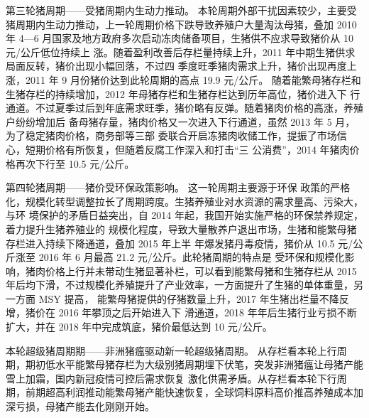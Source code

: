 \documentclass[a4paper,AutoFakeBold,AutoFakeSlant]{ctexart}
\begin{document}
第三轮猪周期——受猪周期内生动力推动。
本轮周期外部干扰因素较少，主要受猪周期内生动力推动，上一轮周期价格下跌导致养殖户大量淘汰母猪，叠加 2010
年 4—6 月国家及地方政府多次启动冻肉储备项目，生猪供不应求导致猪价从 10 元/公斤低位持续上
涨。随着盈利改善后存栏量持续上升，2011 年中期生猪供求局面反转，猪价出现小幅回落，不过四
季度旺季猪肉需求上升，猪价出现再度上涨，2011 年 9 月份猪价达到此轮周期的高点 19.9 元/公斤。
随着能繁母猪存栏和生猪存栏的持续增加，2012 年母猪存栏和生猪存栏达到历年高位，猪价进入下
行通道。不过夏季过后到年底需求旺季，猪价略有反弹。随着猪肉价格的高涨，养殖户纷纷增加后
备母猪存量，猪肉价格又一次进入下行通道，虽然 2013 年 5 月，为了稳定猪肉价格，商务部等三部
委联合开启冻猪肉收储工作，提振了市场信心，短期价格有所恢复，但随着反腐工作深入和打击“三
公消费”，2014 年猪肉价格再次下行至 10.5 元/公斤。

第四轮猪周期——猪价受环保政策影响。
这一轮周期主要源于环保
政策的严格化，规模化转型调整拉长了周期跨度。生猪养殖业对水资源的需求量高、污染大，与环
境保护的矛盾日益突出，自 2014 年起，我国开始实施严格的环保禁养规定，着力提升生猪养殖业的
规模化程度，导致大量散养户退出市场，生猪和能繁母猪存栏进入持续下降通道，叠加 2015 年上半
年爆发猪丹毒疫情，猪价从 10.5 元/公斤涨至 2016 年 6 月最高 21.2 元/公斤。此轮猪周期的特点是
受环保和规模化影响，猪肉价格上行并未带动生猪显著补栏，可以看到能繁母猪和生猪存栏从 2015
年后均下滑，不过规模化养殖提升了产业效率，一方面提升了生猪的单体重量，另一方面 MSY 提高，
能繁母猪提供的仔猪数量上升，2017 年生猪出栏量不降反增，猪价在 2016 年攀顶之后开始进入下
滑通道，2018 年年后生猪行业亏损不断扩大，并在 2018 年中完成筑底，猪价最低达到 10 元/公斤。

本轮超级猪周期期——非洲猪瘟驱动新一轮超级猪周期。
从存栏看本轮上行周期，期初低水平能繁母猪存栏为大级别猪周期埋下伏笔，突发非洲猪瘟让母猪产能雪上加霜，国内新冠疫情可控后需求恢复
激化供需矛盾。从存栏看本轮下行周期，前期超高利润推动能繁母猪产能快速恢复，全球饲料原料高价推高养殖成本加深亏损，母猪产能去化刚刚开始。
\end{document}
